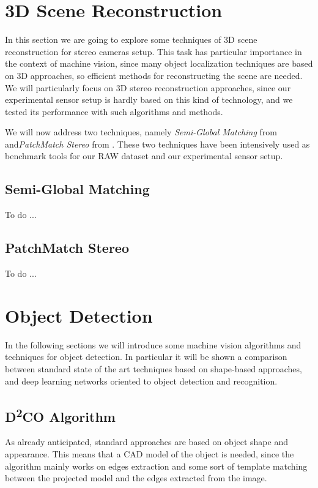 \section{3D Scene Reconstruction}\label{sec:3dreconstruction}
In this section we are going to explore some techniques of 3D scene reconstruction for stereo cameras setup. This task has particular importance in the context of machine vision, since many object localization techniques are based on 3D approaches, so efficient methods for reconstructing the scene are needed. We will particularly focus on 3D stereo reconstruction approaches, since our experimental sensor setup is hardly based on this kind of technology, and we tested its performance with such algorithms and methods.

We will now address two techniques, namely \emph{Semi-Global Matching} from \cite{hirschmuller2005SemiGlobal} and\emph{PatchMatch Stereo} from \cite{bleyer2011PatchMatchStereo}. These two techniques have been intensively used as benchmark tools for our RAW dataset and our experimental sensor setup.

\subsection{Semi-Global Matching}\label{subsec:semiglobalmatching}
To do ...

\subsection{PatchMatch Stereo}\label{subsec:patchmatchstereo}
To do ...

\section{Object Detection}\label{sec:objectdetection}
In the following sections we will introduce some machine vision algorithms and techniques for object detection. In particular it will be shown a comparison between standard state of the art techniques based on shape-based approaches, and deep learning networks oriented to object detection and recognition.

\subsection{D\textsuperscript{2}{CO} Algorithm}\label{subsec:d2co}
As already anticipated, standard approaches are based on object shape and appearance. This means that a CAD model of the object is needed, since the algorithm mainly works on edges extraction and some sort of template matching between the projected model and the edges extracted from the image.

